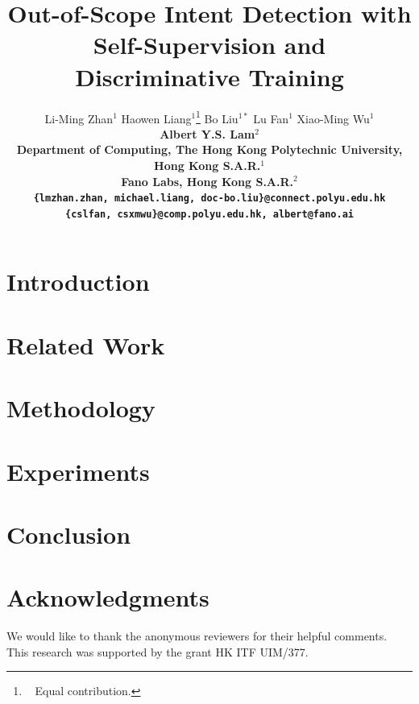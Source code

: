 \documentclass[11pt,a4paper]{article}
\title{Out-of-Scope Intent Detection with Self-Supervision and\\ Discriminative Training}
\author{
Li-Ming Zhan$^1$ \quad Haowen Liang$^1$\thanks{~ Equal contribution.}  \quad Bo Liu$^{1*}$ \quad Lu Fan$^1$ \quad Xiao-Ming Wu$^1$\Thanks{~ Corresponding author.} \\
\quad \bf Albert Y.S. Lam$^2$ \\ 
Department of Computing, The Hong Kong Polytechnic University, Hong Kong S.A.R.$^1$ \\
Fano Labs, Hong Kong S.A.R.$^2$ \\
{\tt \{lmzhan.zhan, michael.liang, doc-bo.liu\}@connect.polyu.edu.hk}\\
{\tt \{cslfan, csxmwu\}@comp.polyu.edu.hk, albert@fano.ai}\\
}
\date{}
\begin{document}
\maketitle
\begin{abstract}

\end{abstract}


\section{Introduction}



\section{Related Work}



\section{Methodology}





\section{Experiments}\label{sec:exp}


\section{Conclusion}


\section*{Acknowledgments}

We would like to thank the anonymous reviewers for their helpful comments. This research was supported by the grant HK ITF UIM/377.
\end{document}
